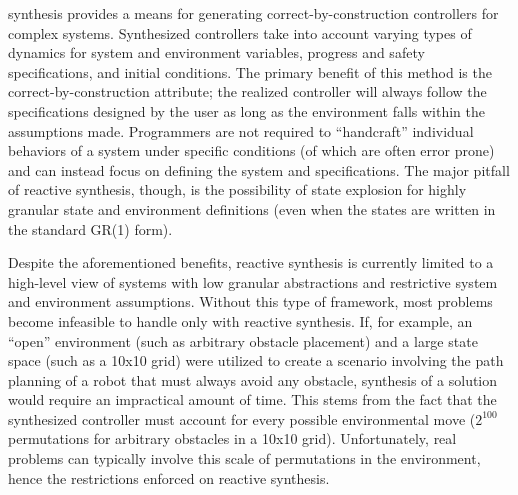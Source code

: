 \documentclass[journal]{IEEEtran}
\begin{document}
 synthesis provides a means for generating correct-by-construction controllers for complex systems. Synthesized controllers take into account varying types of dynamics for system and environment variables, progress and safety specifications, and initial conditions. The primary benefit of this method is the correct-by-construction attribute; the realized controller will always follow the specifications designed by the user as long as the environment falls within the assumptions made. Programmers are not required to “handcraft” individual behaviors of a system under specific conditions (of which are often error prone) and can instead focus on defining the system and specifications. The major pitfall of reactive synthesis, though, is the possibility of state explosion for highly granular state and environment definitions (even when the states are written in the standard GR(1) form).

Despite the aforementioned benefits, reactive synthesis is currently limited to a high-level view of systems with low granular abstractions and restrictive system and environment assumptions. Without this type of framework, most problems become infeasible to handle only with reactive synthesis. If, for example, an “open” environment (such as arbitrary obstacle placement) and a large state space (such as a 10x10 grid) were utilized to create a scenario involving the path planning of a robot that must always avoid any obstacle, synthesis of a solution would require an impractical amount of time. This stems from the fact that the synthesized controller must account for every possible environmental move ($2^{100}$ permutations for arbitrary obstacles in a 10x10 grid). Unfortunately, real problems can typically involve this scale of permutations in the environment, hence the restrictions enforced on reactive synthesis. 
\end{document}
